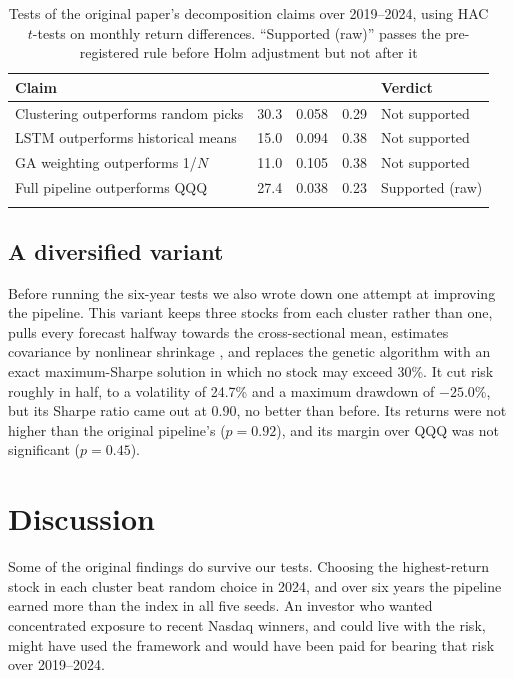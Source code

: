 \begin{table}[ht]
\caption{Tests of the original paper's decomposition claims over 2019--2024, using HAC $t$-tests on monthly return differences. ``Supported (raw)'' passes the pre-registered rule before Holm adjustment but not after it}\label{tab5}
\begin{tabular*}{\textwidth}{@{\extracolsep{\fill}}lrrrl@{}}
\tabletoprule
Claim &  &  &  & Verdict \\
\midrule
Clustering outperforms random picks & 30.3 & 0.058 & 0.29 & Not supported \\
LSTM outperforms historical means & 15.0 & 0.094 & 0.38 & Not supported \\
GA weighting outperforms 1/$N$ & 11.0 & 0.105 & 0.38 & Not supported \\
Full pipeline outperforms QQQ & 27.4 & 0.038 & 0.23 & Supported (raw) \\
\botrule
\end{tabular*}
\end{table}

\subsection{A diversified variant}\label{sec5.5}

Before running the six-year tests we also wrote down one attempt at improving the pipeline. This variant keeps three stocks from each cluster rather than one, pulls every forecast halfway towards the cross-sectional mean, estimates covariance by nonlinear shrinkage \citep{ledoit2020}, and replaces the genetic algorithm with an exact maximum-Sharpe solution in which no stock may exceed 30\%. It cut risk roughly in half, to a volatility of 24.7\% and a maximum drawdown of $-25.0\%$, but its Sharpe ratio came out at 0.90, no better than before. Its returns were not higher than the original pipeline's ($p=0.92$), and its margin over QQQ was not significant ($p=0.45$).

\section{Discussion}\label{sec6}

Some of the original findings do survive our tests. Choosing the highest-return stock in each cluster beat random choice in 2024, and over six years the pipeline earned more than the index in all five seeds. An investor who wanted concentrated exposure to recent Nasdaq winners, and could live with the risk, might have used the framework and would have been paid for bearing that risk over 2019--2024.

